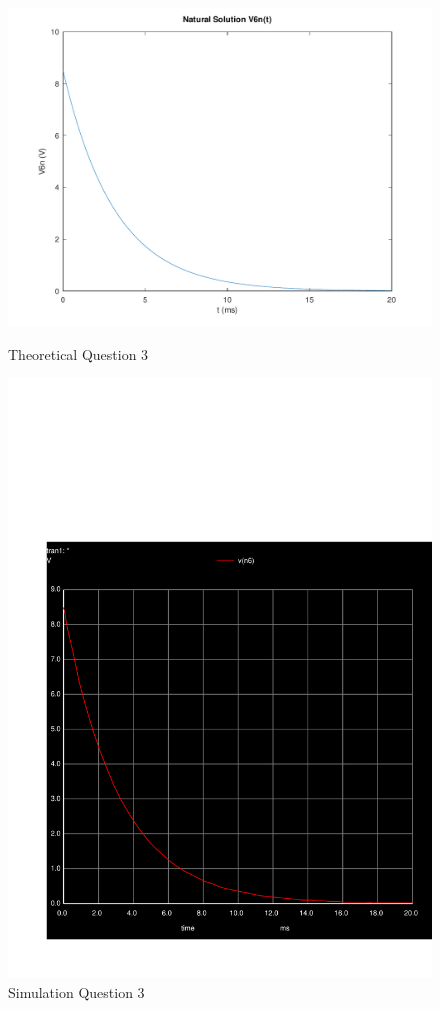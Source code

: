 \begin{figure}[H]
      \includegraphics[width=\linewidth]{../mat/alinea3.pdf}
      \caption{Theoretical Question 3}
    \endminipage\hfill
      \includegraphics[width=\linewidth]{../sim/transient3.pdf}
      \caption{Simulation Question 3}
    \endminipage\hfill
\end{figure}

